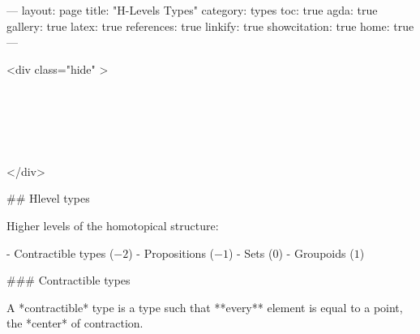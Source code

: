 ---
layout: page
title: "H-Levels Types"
category: types
toc: true
agda: true
gallery: true
latex: true
references: true
linkify: true
showcitation: true
home: true
---

<div class="hide" >
\begin{code}%
\>[0]\AgdaSymbol{\{-\#}\AgdaSpace{}%
\AgdaSpace{}%
\AgdaSpace{}%
\AgdaSymbol{\#-\}}\<%
\\
\>[0]\AgdaSpace{}%
\AgdaModule{\AgdaUnderscore{}}\AgdaSpace{}%
\<%
\\
%
\\[\AgdaEmptyExtraSkip]%
\>[0]\AgdaSpace{}%
\AgdaSpace{}%
\<%
\\
\>[0]\AgdaSpace{}%
\AgdaSpace{}%
\<%
\end{code}
</div>


## Hlevel types

Higher levels of the homotopical structure:

- Contractible types ($-2$)
- Propositions ($-1$)
- Sets ($0$)
- Groupoids ($1$)

### Contractible types

A *contractible* type is a type such that **every**
element is equal to a point, the *center* of contraction.

\begin{code}%
\>[0][@{}l@{\AgdaIndent{1}}]%
\>[2]\<%
\\
\>[0]\<%
\\
\>[0][@{}l@{\AgdaIndent{0}}]%
\>[2]\AgdaSymbol{:}\AgdaSpace{}%
\AgdaSymbol{(}\AgdaSpace{}%
\AgdaSymbol{:}\AgdaSpace{}%
\AgdaSpace{}%
\AgdaSymbol{)}\<%
\\
%
\>[2]\AgdaComment{--------------}\<%
\\
%
\>[2]\AgdaSpace{}%
\AgdaSpace{}%
\<%
\\
%
\\[\AgdaEmptyExtraSkip]%
\>[0]\AgdaSpace{}%
\AgdaSpace{}%
\AgdaSymbol{=}\AgdaSpace{}%
\AgdaSpace{}%
\AgdaSpace{}%
\AgdaSpace{}%
\AgdaSpace{}%
\AgdaSpace{}%
\AgdaSymbol{((}\AgdaSpace{}%
\AgdaSymbol{:}\AgdaSpace{}%
\AgdaSymbol{)}\AgdaSpace{}%
\AgdaSpace{}%
\AgdaSpace{}%
\AgdaOperator{\AgdaDatatype{==}}\AgdaSpace{}%
\AgdaSymbol{))}\<%
\end{code}

